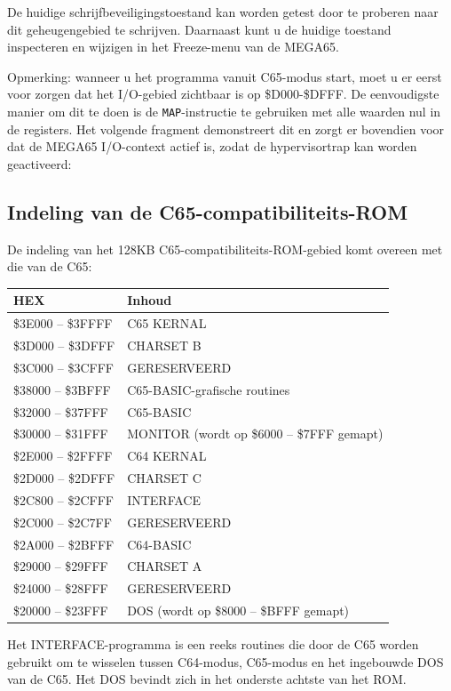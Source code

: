 De huidige schrijfbeveiligingstoestand kan worden getest door te proberen naar dit geheugengebied te schrijven. Daarnaast kunt u de huidige toestand inspecteren en wijzigen in het Freeze-menu van de MEGA65.

Opmerking: wanneer u het programma vanuit C65-modus start, moet u er eerst voor zorgen dat het I/O-gebied zichtbaar is op \$D000-\$DFFF. De eenvoudigste manier om dit te doen is de {\tt MAP}-instructie te gebruiken met alle waarden nul in de registers. Het volgende fragment demonstreert dit en zorgt er bovendien voor dat de MEGA65 I/O-context actief is, zodat de hypervisortrap kan worden geactiveerd:



\subsection{Indeling van de C65-compatibiliteits-ROM}

De indeling van het 128KB C65-compatibiliteits-ROM-gebied komt overeen met die van de C65:

\begin{center}
  {\ttfamily
  \setlength{\tabcolsep}{3pt}
  \begin{tabular}{|l|l|}
  \hline
  {\bf{HEX}} & {\bf{Inhoud}} \\
  \hline
  \$3E000 -- \$3FFFF & C65 KERNAL \\
  \hline
  \$3D000 -- \$3DFFF & CHARSET B \\
  \hline
  \$3C000 -- \$3CFFF & GERESERVEERD \\
  \hline
  \$38000 -- \$3BFFF & C65-BASIC-grafische routines \\
  \hline
  \$32000 -- \$37FFF & C65-BASIC \\
  \hline
  \$30000 -- \$31FFF & MONITOR (wordt op \$6000 -- \$7FFF gemapt) \\
  \hline
  \$2E000 -- \$2FFFF & C64 KERNAL \\
  \hline
  \$2D000 -- \$2DFFF & CHARSET C \\
  \hline
  \$2C800 -- \$2CFFF & INTERFACE \\
  \hline
  \$2C000 -- \$2C7FF & GERESERVEERD \\
  \hline
  \$2A000 -- \$2BFFF & C64-BASIC \\
  \hline
  \$29000 -- \$29FFF & CHARSET A \\
  \hline
  \$24000 -- \$28FFF & GERESERVEERD \\
  \hline
  \$20000 -- \$23FFF & DOS (wordt op \$8000 -- \$BFFF gemapt) \\
  \hline
  \end{tabular}
  }
\end{center}

Het INTERFACE-programma is een reeks routines die door de C65 worden gebruikt om te wisselen tussen C64-modus, C65-modus en het ingebouwde DOS van de C65. Het DOS bevindt zich in het onderste achtste van het ROM.




